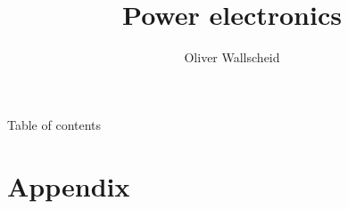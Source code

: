 \documentclass{../course_template/lectureClass}
\title[Power electronics]{Power electronics}
\author{Oliver Wallscheid}
\date{}
\begin{document}

\begin{frame}[plain]
	\titlepage
\end{frame}

\begin{frame}{Table of contents}
	\tableofcontents[hideallsubsections]
\end{frame}



\section{Appendix} %
\end{document}
